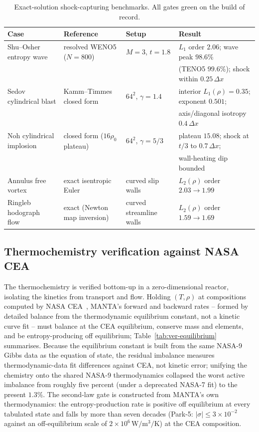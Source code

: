 \documentclass[journal,biblatex]{new-aiaa}
\begin{document}
\begin{table}[H]
\centering\footnotesize\setlength{\tabcolsep}{5pt}
\caption{Exact-solution shock-capturing benchmarks. All gates green on the
build of record.}
\label{tab:exact_benchmarks}
\begin{tabular}{@{}llll@{}}
\toprule
Case & Reference & Setup & Result \\
\midrule
Shu--Osher entropy wave~\cite{shu_efficient_1989} & resolved WENO5 ($N{=}800$) & $M{=}3$, $t{=}1.8$ & $L_1$ order $2.06$; wave peak $98.6\%$ \\
 & & & (TENO5 $99.6\%$); shock within $0.25\,\Delta x$ \\
Sedov cylindrical blast & Kamm--Timmes closed form & $64^2$, $\gamma{=}1.4$ & interior $L_1(\rho)=0.35$; exponent $0.501$; \\
 & & & axis/diagonal isotropy $0.4\,\Delta x$ \\
Noh cylindrical implosion & closed form ($16\rho_0$ plateau) & $64^2$, $\gamma{=}5/3$ & plateau $15.08$; shock at $t/3$ to $0.7\,\Delta x$; \\
 & & & wall-heating dip bounded \\
Annulus free vortex & exact isentropic Euler & curved slip walls & $L_2(\rho)$ order $2.03\to1.99$ \\
Ringleb hodograph flow~\cite{ringleb_exakte_1940} & exact (Newton map inversion) & curved streamline walls & $L_2(\rho)$ order $1.59\to1.69$ \\
\bottomrule
\end{tabular}
\end{table}

\subsection{Thermochemistry verification against NASA CEA}
\label{sec:vv-chem}

The thermochemistry is verified bottom-up in a zero-dimensional reactor, isolating the kinetics from transport and flow. Holding $(T,\rho)$ at compositions computed by NASA CEA~\cite{mcbride_computer_1996,noauthor_nasacea_2026}, MANTA's forward and backward rates -- formed by detailed balance from the thermodynamic equilibrium constant, not a kinetic curve fit -- must balance at the CEA equilibrium, conserve mass and elements, and be entropy-producing off equilibrium; Table~\ref{tab:ver-equilibrium} summarises. Because the equilibrium constant is built from the same NASA-9 Gibbs data as the equation of state, the residual imbalance measures thermodynamic-data fit differences against CEA, not kinetic error; unifying the chemistry onto the shared NASA-9 thermodynamics collapsed the worst active imbalance from roughly five percent (under a deprecated NASA-7 fit) to the present $1.3\%$. The second-law gate is constructed from MANTA's own thermodynamics: the entropy-production rate is positive off equilibrium at every tabulated state and falls by more than seven decades (Park-5: $|\sigma|\le3\times10^{-2}$ against an off-equilibrium scale of $2\times10^{6}\,\unit{\W\per\cubic\m\per\K}$) at the CEA composition.
\end{document}
